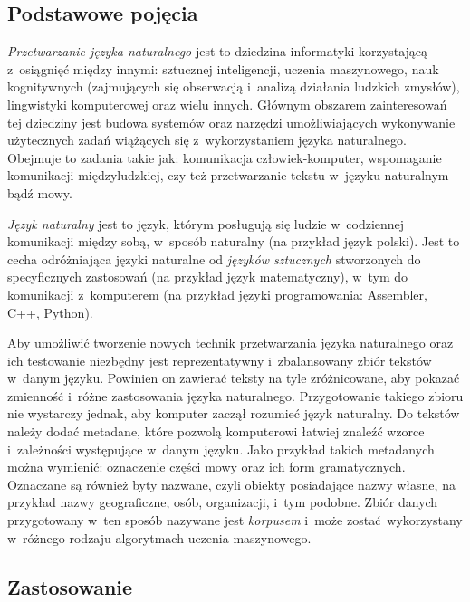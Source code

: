 \documentclass[a4paper, twoside, openright, 12pt]{report}
\begin{document}
        \subsection{Podstawowe pojęcia}
            \emph{Przetwarzanie języka naturalnego} jest to dziedzina informatyki korzystającą z~osiągnięć
            między innymi: sztucznej inteligencji, uczenia maszynowego, nauk kognitywnych
            (zajmujących się obserwacją i~analizą działania ludzkich zmysłów), lingwistyki komputerowej oraz
            wielu innych. Głównym obszarem zainteresowań tej dziedziny jest budowa systemów oraz narzędzi
            umożliwiających wykonywanie użytecznych zadań wiążących się z~wykorzystaniem języka naturalnego.
            Obejmuje to zadania takie jak: komunikacja człowiek-komputer, wspomaganie komunikacji międzyludzkiej,
            czy też przetwarzanie tekstu w~języku naturalnym bądź mowy\cite{SPEECHANDLANGUAGEPROCESSING}.

            \emph{Język naturalny} jest to język,
            którym posługują się ludzie w~codziennej komunikacji między sobą, w~sposób naturalny (na przykład
            język polski). Jest to cecha odróżniająca języki naturalne od \emph{języków sztucznych} stworzonych
            do specyficznych zastosowań (na przykład język matematyczny), w~tym do komunikacji z~komputerem
            (na przykład języki programowania: Assembler, C++, Python).

            Aby umożliwić tworzenie nowych technik
            przetwarzania języka naturalnego oraz ich testowanie niezbędny jest reprezentatywny i~zbalansowany
            zbiór tekstów w~danym języku. Powinien on zawierać teksty na tyle zróżnicowane, aby pokazać zmienność
            i~różne zastosowania języka naturalnego. Przygotowanie takiego zbioru nie wystarczy jednak, aby
            komputer zaczął rozumieć język naturalny. Do tekstów należy dodać metadane, które pozwolą komputerowi
            łatwiej znaleźć wzorce i~zależności występujące w~danym języku. Jako przykład takich metadanych można
            wymienić: oznaczenie części mowy oraz ich form gramatycznych. Oznaczane są również byty nazwane, czyli
            obiekty posiadające nazwy własne, na przykład nazwy geograficzne, osób, organizacji, i~tym podobne.
            Zbiór danych przygotowany w~ten sposób nazywane jest \emph{korpusem}\cite{NATURALLANGUGEANNOTATION}
            i~może zostać wykorzystany w~różnego rodzaju algorytmach uczenia maszynowego.
        \subsection {Zastosowanie}
\end{document}
